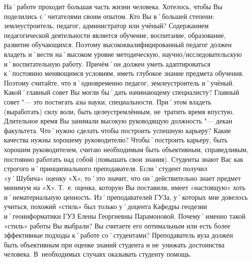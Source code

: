 \begin{drama}
	\maxspeaks На˚работе проходит большая часть жизни человека. Хотелось, чтобы Вы поделились с˚читателями своим опытом. Кто Вы в˚большей степени: землеустроитель, педагог, администратор или учёный?
	\michaelspeaks Содержанием педагогической деятельности является обучение, воспитание, образование, развитие обучающихся. Поэтому высококвалифицированный педагог должен владеть и˚вести на˚высоком уровне методическую, научно\-/исследовательскую и˚воспитательную работу. Причём˚он должен уметь адаптироваться к˚постоянно меняющимся условиям, иметь глубокое знание предмета обучения. Поэтому считайте, что я˚одновременно педагог, землеустроитель и˚учёный.
	\maxspeaks Какой˚главный совет Вы могли бы˚дать начинающему специалисту?
	\michaelspeaks Главный совет "--- это постигать азы науки, специальности. При˚этом владеть (выработать) силу воли, быть целеустремлённым, не~тратить время впустую.
	\maxspeaks Длительное время Вы занимали высокую руководящую должность "--- декан факультета. Что˚нужно сделать чтобы построить успешную карьеру? Какие качества нужны хорошему руководителю?
	\michaelspeaks Чтобы˚построить карьеру, быть хорошим руководителем, считаю необходимым быть объективным, справедливым, постоянно работать над собой (повышать свои знания).
	\maxspeaks Студенты знают Вас как строгого и˚принципиального преподавателя. Если˚студент получил  «у˚Шубича» оценку  «Х», то˚это значит, что он˚действительно знает предмет минимум на  «Х». Т.~е. оценка, которую Вы поставили, имеет  «настоящую» хоть и˚нематериальную ценность. Из˚преподавателей ГУЗа, у˚которых мне довелось учиться, похожий  «стиль» был только у˚доцента Кафедры геодезии и˚геоинформатики ГУЗ Елены Георгиевны Парамоновой. Почему˚именно такой  «стиль» работы Вы выбрали? Вы считаете его оптимальным или есть более эффективные подходы к˚работе со˚студентами?
	\michaelspeaks Преподаватель вуза должен быть объективным при оценке знаний студента и не~унижать достоинства человека. В~необходимых случаях оказывать студенту помощь.


\end{drama}
